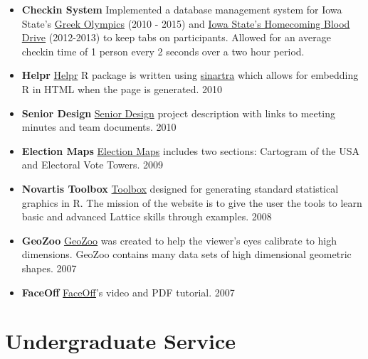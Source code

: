 \documentclass[oneside]{article}
\begin{document}
\begin{itemize}

  \item{\bf Checkin System} Implemented a database management system for Iowa State's \href{http://www.greekweek.barretschloerke.com/}{Greek Olympics} (2010 - 2015) and \href{http://www.homecoming.barretschloerke.com/}{Iowa State's Homecoming Blood Drive} (2012-2013) to keep tabs on participants.  Allowed for an average checkin time of 1 person every 2 seconds over a two hour period.

  \item{\bf Helpr} \href{http://github.com/hadley/helpr}{Helpr} {R} package is written using \href{http://github.com/hadley/sinartra}{sinartra} which allows for embedding R in HTML when the page is generated. 2010

  \item{\bf Senior Design}
  \href{http://seniord.ece.iastate.edu/dec1009/}{Senior Design} project description with links to meeting minutes and team documents. 2010

  \item{\bf Election Maps} \href{http://barretschloerke.com/Election/index.html}{Election Maps} includes two sections: Cartogram of the USA and Electoral Vote Towers. 2009

  \item{\bf Novartis Toolbox} \href{http://barretschloerke.com/Novartis/}{Toolbox} designed for generating standard statistical graphics in R. The mission of the website is to give the user the tools to learn basic and advanced Lattice skills through examples. 2008

  \item{\bf GeoZoo} \href{http://streaming.stat.iastate.edu/~dicook/geometric-data/}{GeoZoo} was created to help the viewer's eyes calibrate to high dimensions. GeoZoo contains many data sets of high dimensional geometric shapes. 2007

  \item{\bf FaceOff} \href{http://www.public.iastate.edu/~bigbear/FaceOff/index.html}{FaceOff}'s video and PDF tutorial. 2007

\end{itemize}





\section{Undergraduate Service}
\end{document}
